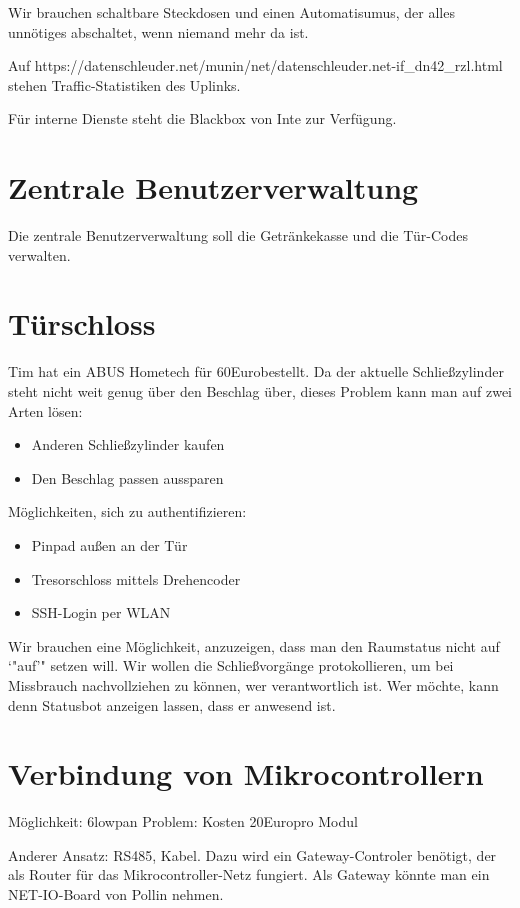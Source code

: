 \documentclass{scrartcl}
\newcommand\euro{Euro}
\newcommand\uc{Mikrocontroller}
\begin{document}
Wir brauchen schaltbare Steckdosen und einen Automatisumus, der alles unnötiges abschaltet, wenn niemand mehr da ist.

Auf https://datenschleuder.net/munin/net/datenschleuder.net-if\_dn42\_rzl.html stehen Traffic-Statistiken des Uplinks.

Für interne Dienste steht die Blackbox von Inte zur Verfügung.

\section{Zentrale Benutzerverwaltung}

Die zentrale Benutzerverwaltung soll die Getränkekasse und die Tür-Codes verwalten.

\section{Türschloss}

Tim hat ein ABUS Hometech für 60\euro bestellt.
Da der aktuelle Schließzylinder steht nicht weit genug über den Beschlag über, dieses Problem kann man auf zwei Arten lösen:
\begin{itemize}
\item{} Anderen Schließzylinder kaufen
\item{} Den Beschlag passen aussparen
\end{itemize}

Möglichkeiten, sich zu authentifizieren:
\begin{itemize}
\item{} Pinpad außen an der Tür
\item{} Tresorschloss mittels Drehencoder
\item{} SSH-Login per WLAN
\end{itemize}

Wir brauchen eine Möglichkeit, anzuzeigen, dass man den Raumstatus nicht auf `"auf'" setzen will.
Wir wollen die Schließvorgänge protokollieren, um bei Missbrauch nachvollziehen zu können, wer verantwortlich ist.
Wer möchte, kann denn Statusbot anzeigen lassen, dass er anwesend ist.

\section{Verbindung von Mikrocontrollern}

Möglichkeit: 6lowpan
Problem: Kosten 20\euro pro Modul

Anderer Ansatz: RS485, Kabel. Dazu wird ein Gateway-Controler benötigt, der als Router für das \uc-Netz fungiert.
Als Gateway könnte man ein NET-IO-Board von Pollin nehmen.
\end{document}
